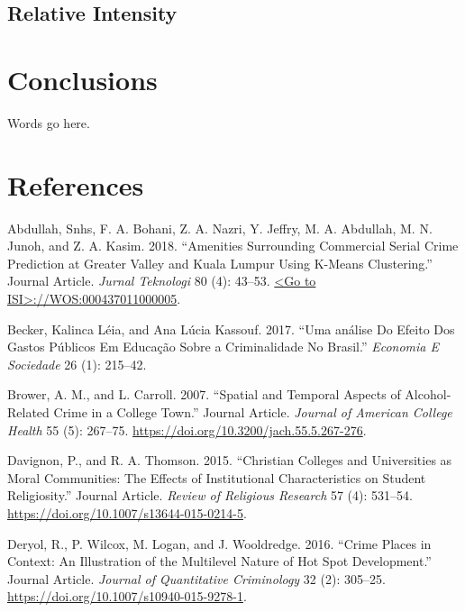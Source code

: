 \documentclass[smallextended]{svjour3}       %
\begin{document}
\hypertarget{relative-intensity-1}{%
\subsection{Relative Intensity}\label{relative-intensity-1}}

\hypertarget{conclusions}{%
\section{Conclusions}\label{conclusions}}

Words go here.

\hypertarget{references}{%
\section*{References}\label{references}}

\hypertarget{refs}{}
\leavevmode\hypertarget{ref-Abdullah2018amenities}{}%
Abdullah, Snhs, F. A. Bohani, Z. A. Nazri, Y. Jeffry, M. A. Abdullah, M.
N. Junoh, and Z. A. Kasim. 2018. ``Amenities Surrounding Commercial
Serial Crime Prediction at Greater Valley and Kuala Lumpur Using K-Means
Clustering.'' Journal Article. \emph{Jurnal Teknologi} 80 (4): 43--53.
\href{\%3CGo\%20to\%20ISI\%3E://WOS:000437011000005}{\textless{}Go to ISI\textgreater{}://WOS:000437011000005}.

\leavevmode\hypertarget{ref-Becker2017analise}{}%
Becker, Kalinca Léia, and Ana Lúcia Kassouf. 2017. ``Uma análise Do
Efeito Dos Gastos Públicos Em Educação Sobre a Criminalidade No
Brasil.'' \emph{Economia E Sociedade} 26 (1): 215--42.

\leavevmode\hypertarget{ref-Brower2007spatial}{}%
Brower, A. M., and L. Carroll. 2007. ``Spatial and Temporal Aspects of
Alcohol-Related Crime in a College Town.'' Journal Article.
\emph{Journal of American College Health} 55 (5): 267--75.
\url{https://doi.org/10.3200/jach.55.5.267-276}.

\leavevmode\hypertarget{ref-Davignon2015christian}{}%
Davignon, P., and R. A. Thomson. 2015. ``Christian Colleges and
Universities as Moral Communities: The Effects of Institutional
Characteristics on Student Religiosity.'' Journal Article. \emph{Review
of Religious Research} 57 (4): 531--54.
\url{https://doi.org/10.1007/s13644-015-0214-5}.

\leavevmode\hypertarget{ref-Deryol2016crime}{}%
Deryol, R., P. Wilcox, M. Logan, and J. Wooldredge. 2016. ``Crime Places
in Context: An Illustration of the Multilevel Nature of Hot Spot
Development.'' Journal Article. \emph{Journal of Quantitative
Criminology} 32 (2): 305--25.
\url{https://doi.org/10.1007/s10940-015-9278-1}.
\end{document}

